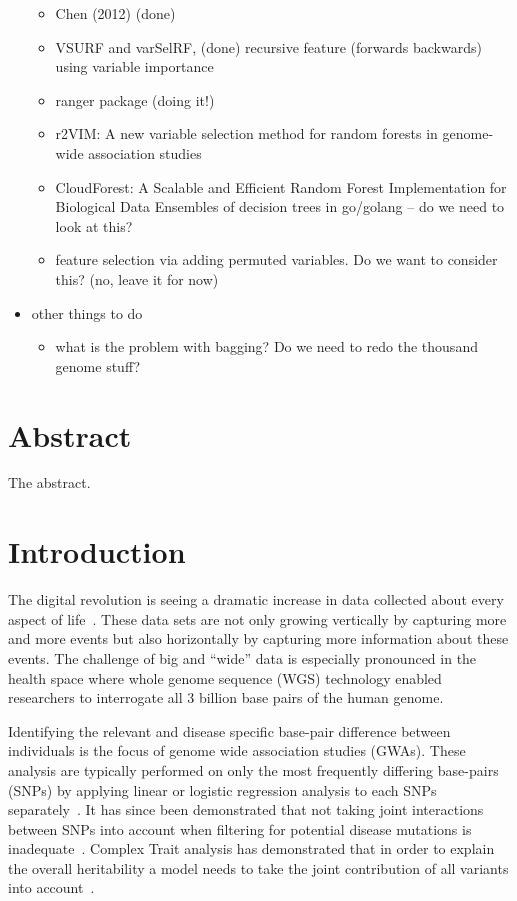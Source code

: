 \documentclass[10pt,a4paper]{article}  %
\begin{document}
\begin{itemize}
\begin{itemize}
  \item Chen (2012)  (done)
  \item VSURF and  varSelRF, (done) recursive feature (forwards backwards) using variable importance
  \item \cite{Wright.and.Ziegle.2016} ranger package (doing it!)
  \item  r2VIM: A new variable selection method for random forests in
    genome-wide association studies
  \item CloudForest: A Scalable and Efficient Random Forest
    Implementation for Biological Data
   Ensembles of decision trees in go/golang   --  do we need to look
   at this? 
  \item \cite{Tuv.et.al.2009} feature selection via adding permuted variables. Do we want to consider this? (no, leave it for now)
  \end{itemize}
\item other things to do
  \begin{itemize}
  \item what is the problem with bagging? Do we need to redo the thousand genome stuff?
  \end{itemize}
\end{itemize}


\clearpage

\section{Abstract}
The abstract.

\linenumbers

\section{Introduction}

The digital revolution is seeing a dramatic increase in data collected about every aspect of 
life~\cite{Loebbecke2015}.  These data sets are not only growing vertically by capturing more and more events but also
horizontally by capturing more information about these events.  The challenge of big and ``wide'' data is especially
pronounced in the health space where whole genome sequence (WGS) technology enabled researchers to interrogate all 3
billion base pairs of the human genome.  

Identifying the relevant and disease specific base-pair difference between individuals is the focus of genome wide association studies (GWAs).
These analysis are typically performed on only the most frequently differing base-pairs (SNPs) by applying linear or logistic regression analysis to each SNPs separately~\cite{CCC2007}.
It has since been demonstrated that not taking joint interactions between SNPs into account when filtering for potential disease mutations is inadequate~\cite{Manolio2009}. 
Complex Trait analysis has demonstrated that in order to explain the overall heritability a model needs to take the joint contribution of all variants into account~\cite{Yang2011}.
\end{document}
